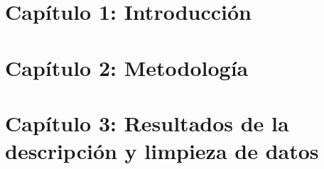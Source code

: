 \documentclass[11pt,a4paper,twoside]{tesis}
\begin{document}
\def\titulo{Magister en explotación de datos y descubrimiento del conocimiento}

\def\autor{Ing. María del Pilar Ávila Williams}
\def\tituloTesis{Aplicación de técnicas de graph mining para buscar patrones
 en la lista de problemas de la historia clínica del Hospital Italiano de Buenos Aires.}
\def\runtitulo{Aplicación de técnicas de graph mining para buscar patrones en la lista de problemas de la historia clínica del Hospital Italiano de Buenos Aires}
\def\runtitle{Application of graph mining techniques to look for patterns in the list of problems in the medical history of the Hospital Italiano de Buenos Aires}
\def\director{Dr. Marcelo Soria}
\def\lugar{Buenos Aires, 2018}


\frontmatter
\pagestyle{empty}


\cleardoublepage


\cleardoublepage

\cleardoublepage

\cleardoublepage
\setcounter{tocdepth}{3}
\setcounter{secnumdepth}{3}
\tableofcontents
\renewcommand{\listfigurename}{Listado de figuras}
\listoffigures
 
\renewcommand{\listtablename}{Listado de tablas}
\listoftables


\printglossary[type=\acronymtype,title={Abreviaturas}]

\cleardoublepage
\mainmatter
\pagestyle{headings}


\chapter{Capítulo 1: Introducción}


\chapter{Capítulo 2: Metodología}


\chapter{Capítulo 3: Resultados de la descripción y limpieza de datos}

 
\end{document}
